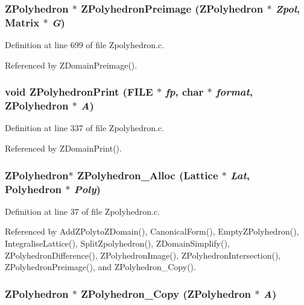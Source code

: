 \subsubsection{\setlength{\rightskip}{0pt plus 5cm}ZPolyhedron $\ast$ ZPolyhedron\-Preimage (ZPolyhedron $\ast$ {\em Zpol}, Matrix $\ast$ {\em G})\hspace{0.3cm}{\tt  [static]}}\label{Zpolyhedron_8c_a6}




Definition at line 699 of file Zpolyhedron.c.

Referenced by ZDomain\-Preimage().

\subsubsection{\setlength{\rightskip}{0pt plus 5cm}void ZPolyhedron\-Print (FILE $\ast$ {\em fp}, char $\ast$ {\em format}, ZPolyhedron $\ast$ {\em A})\hspace{0.3cm}{\tt  [static]}}\label{Zpolyhedron_8c_a8}




Definition at line 337 of file Zpolyhedron.c.

Referenced by ZDomain\-Print().

\subsubsection{\setlength{\rightskip}{0pt plus 5cm}ZPolyhedron$\ast$ ZPolyhedron\_\-Alloc (Lattice $\ast$ {\em Lat}, Polyhedron $\ast$ {\em Poly})}\label{Zpolyhedron_8c_a10}




Definition at line 37 of file Zpolyhedron.c.

Referenced by Add\-ZPolyto\-ZDomain(), Canonical\-Form(), Empty\-ZPolyhedron(), Integralise\-Lattice(), Split\-Zpolyhedron(), ZDomain\-Simplify(), ZPolyhedron\-Difference(), ZPolyhedron\-Image(), ZPolyhedron\-Intersection(), ZPolyhedron\-Preimage(), and ZPolyhedron\_\-Copy().

\subsubsection{\setlength{\rightskip}{0pt plus 5cm}ZPolyhedron $\ast$ ZPolyhedron\_\-Copy (ZPolyhedron $\ast$ {\em A})\hspace{0.3cm}{\tt  [static]}}\label{Zpolyhedron_8c_a2}




